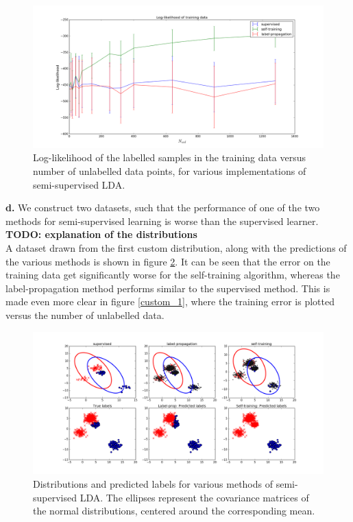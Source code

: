 \documentclass [a4paper] {report}
\begin{document}
	\begin{figure}[H]
		\begin{center}
			\includegraphics[scale=0.32]{Images/spambase_likelihood.png}
			\caption{Log-likelihood of the labelled samples in the training data versus number of unlabelled data points, for various implementations of semi-supervised LDA.}
			\label{spambase_likelihood}
		\end{center}
	\end{figure}
	
	\textbf{d.}
	We construct two datasets, such that the performance of one of the two methods for semi-supervised learning is worse than the supervised learner.\\
	\textbf{TODO: explanation of the distributions}\\
	A dataset drawn from the first custom distribution, along with the predictions of the various methods is shown in figure \ref{custom_1_dist}. It can be seen that the error on the training data get significantly worse for the self-training algorithm, whereas the label-propagation method performs similar to the supervised method. This is made even more clear in figure \ref{custom_1}, where the training error is plotted versus the number of unlabelled data.
	
	\begin{figure}[H]
		\begin{center}
			\includegraphics[scale=0.3]{Images/custom1.png}
			\caption{Distributions and predicted labels for various methods of semi-supervised LDA. The ellipses represent the covariance matrices of the normal distributions, centered around the corresponding mean.}
			\label{custom_1_dist}
		\end{center}
	\end{figure}	
	
\end{document}

